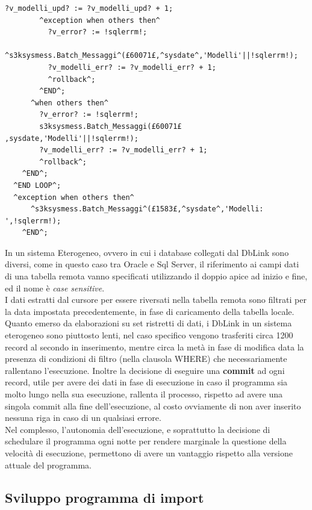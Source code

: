 \begin{lstlisting}[frame=single, style=base]
           ?v_modelli_upd? := ?v_modelli_upd? + 1;
        ^exception when others then^
          ?v_error? := !sqlerrm!;
          ^s3ksysmess.Batch_Messaggi^(£60071£,^sysdate^,'Modelli'||!sqlerrm!);
          ?v_modelli_err? := ?v_modelli_err? + 1;
          ^rollback^;
        ^END^;
      ^when others then^
        ?v_error? := !sqlerrm!;
        s3ksysmess.Batch_Messaggi(£60071£ ,sysdate,'Modelli'||!sqlerrm!);
        ?v_modelli_err? := ?v_modelli_err? + 1;
        ^rollback^;
    ^END^;
  ^END LOOP^;
  ^exception when others then^
      ^s3ksysmess.Batch_Messaggi^(£1583£,^sysdate^,'Modelli: ',!sqlerrm!);
    ^END^;
\end{lstlisting}
In un sistema Eterogeneo, ovvero in cui i database collegati dal DbLink sono diversi, come in questo caso tra Oracle e Sql Server, il riferimento ai campi dati di una tabella remota vanno specificati utilizzando il doppio apice ad inizio e fine, ed il nome è \textit{case sensitive}.\\
I dati estratti dal cursore per essere riversati nella tabella remota sono filtrati per la data impostata precedentemente, in fase di caricamento della tabella locale.
Quanto emerso da elaborazioni su set ristretti di dati, i DbLink in un sistema eterogeneo sono piuttosto lenti, nel caso specifico vengono trasferiti circa 1200 record al secondo in inserimento, mentre circa la metà in fase di modifica data la presenza di condizioni di filtro (nella clausola WHERE) che necessariamente rallentano l'esecuzione. Inoltre la decisione di eseguire una \textbf{commit} ad ogni record, utile per avere dei dati in fase di esecuzione in caso il programma sia molto lungo nella sua esecuzione, rallenta il processo, rispetto ad avere una singola commit alla fine dell'esecuzione, al costo ovviamente di non aver inserito nessuna riga in caso di un qualsiasi errore.\\
Nel complesso, l'autonomia dell'esecuzione, e soprattutto la decisione di schedulare il programma ogni notte per rendere marginale la questione della velocità di esecuzione, permettono di avere un vantaggio rispetto alla versione attuale del programma.
\subsection{Sviluppo programma di import}
